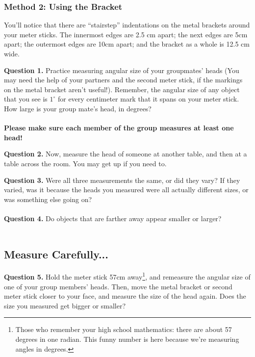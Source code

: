 \documentclass[11pt]{article}
\begin{document}
\subsubsection{Method 2: Using the Bracket}

You'll notice that there are ``stairstep'' indentations on the metal brackets around your meter sticks. The innermost edges are 2.5 cm apart; the next edges are 5cm apart; the outermost edges are 10cm apart; and the bracket as a 
whole is 12.5 cm wide. 


\textbf{Question 1.} Practice measuring angular size of your groupmates' heads (You may need the help of your partners and the second meter stick, if the markings on the metal bracket aren't useful!).
Remember, the angular size of any object that you see is $1^\circ$ for every centimeter mark that it spans on your meter stick. How large is your group mate's head, in degrees?\\

\vspace*{1.5cm}
\hrulefill\\
\textbf{Please make sure each member of the group measures at least one head!}

\textbf{Question 2.} Now, measure the head of someone at another table, and then at a table across the room. You may get up if you need to.\\

\vspace{1.5cm}
\hrulefill



\textbf{Question 3.} Were all three measurements the same, or did they vary? If they varied, was it because the heads you measured were all actually different sizes, or was something else going on?\\

\vspace{1.5cm}
\hrulefill\\

\textbf{Question 4.} Do objects that are farther away appear smaller or larger?\\

\vspace{1.5cm}
\hrulefill\\

\subsection{Measure Carefully...}

\textbf{Question 5.} Hold the meter stick 57cm away\footnote{Those who remember your high school mathematics: there are about 57 degrees in one radian. This funny number is here because we're measuring angles in degrees.}, and remeasure the angular size of one of your group members' heads. Then, move the metal bracket or second meter stick closer to your face, and measure the size of the head again. Does the size you measured get bigger or smaller?\\ 
\end{document}
